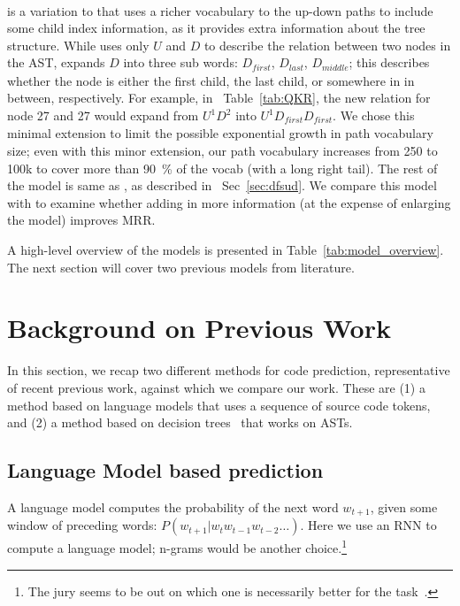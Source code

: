 \documentclass[nonacm, sigconf]{acmart}
\newcommand{\secref}[1]{Sec~\ref{#1}}
\newcommand{\tabref}[1]{Table~\ref{#1}}
\begin{document}
\paragraph{\textbf{\TreeReli}}
\TreeReli is a variation to \TreeRel that uses a richer vocabulary to the up-down paths to include some child index information, as it provides extra information about the tree structure. While \TreeRel uses only $U$ and $D$ to describe the relation between two nodes in the AST, \TreeReli expands $D$ into three sub words: $D_{\mathit{first}}$, $D_{\mathit{last}}$, $D_{\mathit{middle}}$; this describes whether the node is either the first child, the last child, or somewhere in in between, respectively. For example, in ~\tabref{tab:QKR}, the new relation for node 27 and 27 would expand from $U^1D^2$ into $U^1D_{\mathit{first}}D_{\mathit{first}}$. We chose this minimal extension to limit the possible exponential growth in path vocabulary size; even with this minor extension, our path vocabulary increases from 250 to 100k to cover more than 90~\% of the vocab (with a long right tail). The rest of the model is same as \TreeRel, as described in ~\secref{sec:dfsud}. We compare this model with \TreeRel to examine whether adding in more information (at the expense of enlarging the model) improves MRR.  

A high-level overview of the models is presented in \tabref{tab:model_overview}. The next section will cover two previous models from literature.
 
\section{Background on Previous Work}
\label{sec:previouswork}

In this section, we recap two different methods for code prediction, representative of recent previous work, against which we compare
our work.  These are (1) a method based on language models that uses a sequence of source code tokens, and (2) a  method based on decision trees~\cite{raychev2016probabilistic-deep3-eth-dt} that works on ASTs.

\subsection{Language Model based prediction}

A language model computes the probability of the next word $w_{t+1}$, given some window of preceding words:
\(
P(w_{t+1} | w_t w_{t-1} w_{t-2} \ldots)
\).  Here we use an RNN to compute a language model; n-grams would be another choice.\footnote{The jury seems to be out on which one is necessarily better for the task~\cite{hellendoorn2017are-deep-best, karampatsis2020big-bpe}.}
\end{document}
